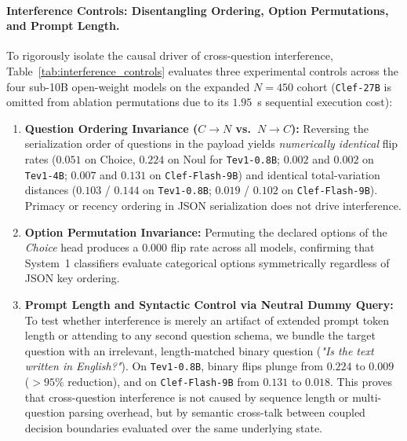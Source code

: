 \documentclass[10pt]{article}
\begin{document}
\paragraph{Interference Controls: Disentangling Ordering, Option Permutations, and Prompt Length.}
To rigorously isolate the causal driver of cross-question interference, Table~\ref{tab:interference_controls} evaluates three experimental controls across the four sub-10B open-weight models on the expanded $N=450$ cohort (\texttt{Clef-27B} is omitted from ablation permutations due to its $1.95$~s sequential execution cost):
\begin{enumerate}
\item \textbf{Question Ordering Invariance ($C \to N$ vs.\ $N \to C$):} Reversing the serialization order of questions in the payload yields \emph{numerically identical} flip rates ($0.051$ on Choice, $0.224$ on Noul for \texttt{Tev1-0.8B}; $0.002$ and $0.002$ on \texttt{Tev1-4B}; $0.007$ and $0.131$ on \texttt{Clef-Flash-9B}) and identical total-variation distances ($0.103$ / $0.144$ on \texttt{Tev1-0.8B}; $0.019$ / $0.102$ on \texttt{Clef-Flash-9B}). Primacy or recency ordering in JSON serialization does not drive interference.
\item \textbf{Option Permutation Invariance:} Permuting the declared options of the \emph{Choice} head produces a $0.000$ flip rate across all models, confirming that System~1 classifiers evaluate categorical options symmetrically regardless of JSON key ordering.
\item \textbf{Prompt Length and Syntactic Control via Neutral Dummy Query:} To test whether interference is merely an artifact of extended prompt token length or attending to any second question schema, we bundle the target question with an irrelevant, length-matched binary question (\emph{"Is the text written in English?"}). On \texttt{Tev1-0.8B}, binary flips plunge from $0.224$ to $0.009$ ($>95\%$ reduction), and on \texttt{Clef-Flash-9B} from $0.131$ to $0.018$. This proves that cross-question interference is not caused by sequence length or multi-question parsing overhead, but by semantic cross-talk between coupled decision boundaries evaluated over the same underlying state.
\end{enumerate}
\end{document}
